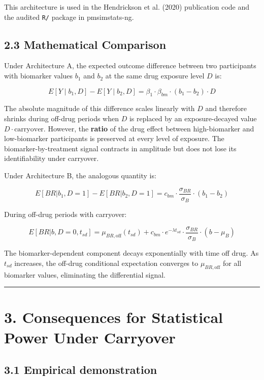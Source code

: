 \documentclass[11pt]{article}
\begin{document}
This architecture is used in the Hendrickson et al. (2020)
publication code and the audited \texttt{R/} package in pmsimstats-ng.

\subsection{2.3 Mathematical Comparison}

Under Architecture A, the expected outcome difference between
two participants with biomarker values $b_1$ and $b_2$ at the
same drug exposure level $D$ is:

\[E[Y \mid b_1, D] - E[Y \mid b_2, D] = \beta_1 \cdot \beta_{bm}
\cdot (b_1 - b_2) \cdot D\]

The absolute magnitude of this difference scales linearly with
$D$ and therefore shrinks during off-drug periods when $D$ is
replaced by an exposure-decayed value $D \cdot \text{carryover}$.
However, the \textbf{ratio} of the drug effect between
high-biomarker and low-biomarker participants is preserved at
every level of exposure. The biomarker-by-treatment signal
contracts in amplitude but does not lose its identifiability
under carryover.

Under Architecture B, the analogous quantity is:

\[E[BR | b_1, D=1] - E[BR | b_2, D=1] = c_{bm} \cdot
\frac{\sigma_{BR}}{\sigma_B} \cdot (b_1 - b_2)\]

During off-drug periods with carryover:

\[E[BR | b, D=0, t_{sd}] = \mu_{BR,\text{off}}(t_{sd}) +
c_{bm} \cdot e^{-\lambda t_{sd}} \cdot
\frac{\sigma_{BR}}{\sigma_B} \cdot (b - \mu_B)\]

The biomarker-dependent component decays exponentially with
time off drug. As $t_{sd}$ increases, the off-drug conditional
expectation converges to $\mu_{BR,\text{off}}$ for all
biomarker values, eliminating the differential signal.

\bigskip\noindent\rule{\textwidth}{0.4pt}\bigskip

\section{3. Consequences for Statistical Power Under Carryover}

\subsection{3.1 Empirical demonstration}
\end{document}
